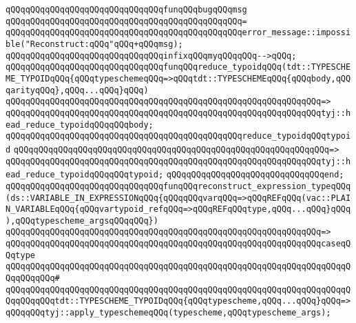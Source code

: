 \newline
\verb|qQQqqQQqqQQqqQQqqQQqqQQqqQQqqQQqfunqQQqbugqQQqmsg|\newline
\verb|qQQqqQQqqQQqqQQqqQQqqQQqqQQqqQQqqQQqqQQqqQQqqQQq=|\newline
\verb|qQQqqQQqqQQqqQQqqQQqqQQqqQQqqQQqqQQqqQQqqQQqqQQqerror_message::impossible("Reconstruct:qQQq"qQQq+qQQqmsg);|\newline
\newline
\verb|qQQqqQQqqQQqqQQqqQQqqQQqqQQqqQQqinfixqQQqmyqQQqqQQq-->qQQq;|\newline
\newline
\verb|qQQqqQQqqQQqqQQqqQQqqQQqqQQqqQQqfunqQQqreduce_typoidqQQq(tdt::TYPESCHEME_TYPOIDqQQq{qQQqtypeschemeqQQq=>qQQqtdt::TYPESCHEMEqQQq{qQQqbody,qQQqarityqQQq},qQQq...qQQq}qQQq)|\newline
\verb|qQQqqQQqqQQqqQQqqQQqqQQqqQQqqQQqqQQqqQQqqQQqqQQqqQQqqQQqqQQqqQQq=>|\newline
\verb|qQQqqQQqqQQqqQQqqQQqqQQqqQQqqQQqqQQqqQQqqQQqqQQqqQQqqQQqqQQqqQQqtyj::head_reduce_typoidqQQqqQQqbody;|\newline
\newline
\verb|qQQqqQQqqQQqqQQqqQQqqQQqqQQqqQQqqQQqqQQqqQQqqQQqreduce_typoidqQQqtypoid|\newline
\verb|qQQqqQQqqQQqqQQqqQQqqQQqqQQqqQQqqQQqqQQqqQQqqQQqqQQqqQQqqQQqqQQq=>|\newline
\verb|qQQqqQQqqQQqqQQqqQQqqQQqqQQqqQQqqQQqqQQqqQQqqQQqqQQqqQQqqQQqqQQqtyj::head_reduce_typoidqQQqqQQqtypoid;|\newline
\verb|qQQqqQQqqQQqqQQqqQQqqQQqqQQqqQQqend;|\newline
\newline
\verb|qQQqqQQqqQQqqQQqqQQqqQQqqQQqqQQqfunqQQqreconstruct_expression_typeqQQq(ds::VARIABLE_IN_EXPRESSIONqQQq{qQQqqQQqvarqQQq=>qQQqREFqQQq(vac::PLAIN_VARIABLEqQQq{qQQqvartypoid_refqQQq=>qQQqREFqQQqtype,qQQq...qQQq}qQQq),qQQqtypescheme_argsqQQqqQQq})|\newline
\verb|qQQqqQQqqQQqqQQqqQQqqQQqqQQqqQQqqQQqqQQqqQQqqQQqqQQqqQQqqQQqqQQq=>|\newline
\verb|qQQqqQQqqQQqqQQqqQQqqQQqqQQqqQQqqQQqqQQqqQQqqQQqqQQqqQQqqQQqqQQqcaseqQQqtype|\newline
\verb|qQQqqQQqqQQqqQQqqQQqqQQqqQQqqQQqqQQqqQQqqQQqqQQqqQQqqQQqqQQqqQQqqQQqqQQqqQQqqQQq#|\newline
\verb|qQQqqQQqqQQqqQQqqQQqqQQqqQQqqQQqqQQqqQQqqQQqqQQqqQQqqQQqqQQqqQQqqQQqqQQqqQQqqQQqtdt::TYPESCHEME_TYPOIDqQQq{qQQqtypescheme,qQQq...qQQq}qQQq=>qQQqqQQqtyj::apply_typeschemeqQQq(typescheme,qQQqtypescheme_args);|\newline

